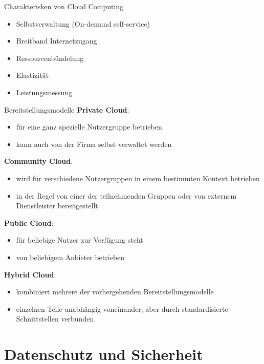 \documentclass[german]{spicker}
\begin{document}
\begin{bonus}{Charakterisken von Cloud Computing}
    \begin{itemize}
        \item Selbstverwaltung (On-demand self-service)
        \item Breitband Internetzugang
        \item Ressourcenbündelung
        \item Elastizität
        \item Leistungsmessung
    \end{itemize}
\end{bonus}

\begin{defi}{Bereitstellungsmodelle}
    \textbf{Private Cloud}:
    \begin{itemize}
        \item für eine ganz spezielle Nutzergruppe betrieben
        \item kann auch von der Firma selbst verwaltet werden
    \end{itemize}

    \textbf{Community Cloud}:
    \begin{itemize}
        \item wird für verschiedene Nutzergruppen in einem bestimmten Kontext betrieben
        \item in der Regel von einer der teilnehmenden Gruppen oder von externem Dienstleister bereitgestellt
    \end{itemize}

    \textbf{Public Cloud}:
    \begin{itemize}
        \item für beliebige Nutzer zur Verfügung steht
        \item von beliebigem Anbieter betrieben
    \end{itemize}

    \textbf{Hybrid Cloud}:
    \begin{itemize}
        \item kombiniert mehrere der vorhergehenden Bereitstellungsmodelle
        \item einzelnen Teile unabhängig voneinander, aber durch standardisierte Schnittstellen verbunden
    \end{itemize}
\end{defi}

\section{Datenschutz und Sicherheit}
\end{document}
